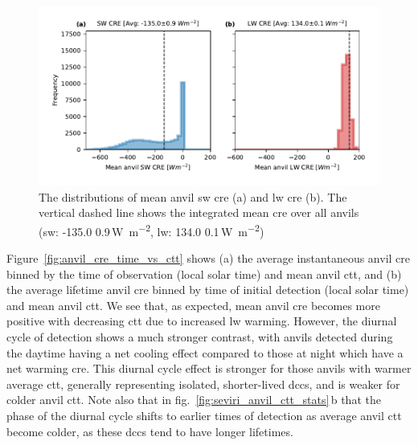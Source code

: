 \documentclass[acp, manuscript]{copernicus}
\begin{document}
\begin{figure}[tp]
    \includegraphics[width=12cm]{figures/fig12.pdf}
    \caption[
    The distributions of mean anvil \acrshort{sw} \acrshort{cre} and \acrshort{lw} \acrshort{cre}
    ]{
    The distributions of mean anvil \acrshort{sw} \acrshort{cre} (a) and \acrshort{lw} \acrshort{cre} (b). The vertical dashed line shows the integrated mean \acrshort{cre} over all anvils (\acrshort{sw}: -135.0\,\textpm\,0.9\,\unit{W m^{-2}}, \acrshort{lw}: 134.0\,\textpm\,0.1\,\unit{W m^{-2}})
    }
    \label{fig:anvil_sw_lw_cre}
\end{figure}


Figure~\ref{fig:anvil_cre_time_vs_ctt} shows (a) the average instantaneous anvil \acrshort{cre} binned by the time of observation (local solar time) and mean anvil \acrshort{ctt}, and (b) the average lifetime anvil \acrshort{cre} binned by time of initial detection (local solar time) and mean anvil \acrshort{ctt}.
We see that, as expected, mean anvil \acrshort{cre} becomes more positive with decreasing \acrshort{ctt} due to increased \acrshort{lw} warming. 
However, the diurnal cycle of detection shows a much stronger contrast, with anvils detected during the daytime having a net cooling effect compared to those at night which have a net warming \acrshort{cre}. 
This diurnal cycle effect is stronger for those anvils with warmer average \acrshort{ctt}, generally representing isolated, shorter-lived \acrshort{dcc}s, and is weaker for colder anvil \acrshort{ctt}. 
Note also that in fig.~\ref{fig:seviri_anvil_ctt_stats}\,b that the phase of the diurnal cycle shifts to earlier times of detection as average anvil \acrshort{ctt} become colder, as these \acrshort{dcc}s tend to have longer lifetimes.
\end{document}
